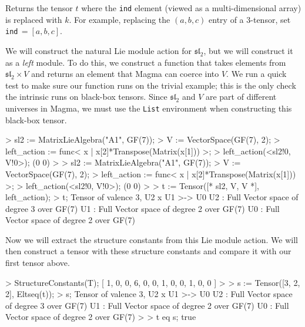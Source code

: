 Returns the tensor $t$ where the \texttt{ind} element (viewed as a
multi-dimensional array) is replaced with $k$. For example, replacing the
$(a,b,c)$ entry of a $3$-tensor, set \texttt{ind}$\,=[a,b,c]$. 

\begin{example}[SCFromBBTensors]

We will construct the natural Lie module action for $\mathfrak{sl}_2$, but we
will construct it as a \emph{left} module. To do this, we construct a function
that takes elements from $\mathfrak{sl}_2\times V$ and returns an element that
\textsf{Magma} can coerce into $V$. We run a quick test to make sure our function runs on
the trivial example; this is the only check the intrinsic runs on black-box
tensors. Since $\mathfrak{sl}_2$ and $V$ are part of different universes in
\textsf{Magma}, we must use the \texttt{List} environment when constructing this
black-box tensor. 

\begin{code}
> sl2 := MatrixLieAlgebra("A1", GF(7));
> V := VectorSpace(GF(7), 2);
> left_action := func< x | x[2]*Transpose(Matrix(x[1])) >;
> left_action(<sl2!0, V!0>);
(0 0)
> 
> sl2 := MatrixLieAlgebra("A1", GF(7));
> V := VectorSpace(GF(7), 2);
> left_action := func< x | x[2]*Transpose(Matrix(x[1])) >;
> left_action(<sl2!0, V!0>);
(0 0)
> 
> t := Tensor([* sl2, V, V *], left_action);
> t;
Tensor of valence 3, U2 x U1 >-> U0
U2 : Full Vector space of degree 3 over GF(7)
U1 : Full Vector space of degree 2 over GF(7)
U0 : Full Vector space of degree 2 over GF(7)
\end{code}

Now we will extract the structure constants from this Lie module action. We will
then construct a tensor with these structure constants and compare it with our
first tensor above.

\begin{code}
> StructureConstants(T);
[ 1, 0, 0, 6, 0, 0, 1, 0, 0, 1, 0, 0 ]
> 
> s := Tensor([3, 2, 2], Eltseq(t));
> s;
Tensor of valence 3, U2 x U1 >-> U0
U2 : Full Vector space of degree 3 over GF(7)
U1 : Full Vector space of degree 2 over GF(7)
U0 : Full Vector space of degree 2 over GF(7)
> 
> t eq s;
true
\end{code}
\end{example}


